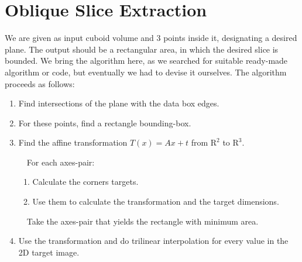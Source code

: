 \section{Oblique Slice Extraction}
\label{sec:oblique}
We are given as input cuboid volume and 3 points inside it, designating a desired plane.
The output should be a rectangular area, in which the desired slice is bounded.
We bring the algorithm here, as we searched for suitable ready-made algorithm or code, but eventually we had to devise it ourselves.
The algorithm proceeds as follows:
\begin{enumerate}
	\item Find intersections of the plane with the data box edges.
	\item For these points, find a rectangle bounding-box.
	\item Find the affine transformation $T(x) = Ax + t $ from $\textrm{R} ^2$ to $\textrm{R}^3$.

	~~For each axes-pair:
	\begin{enumerate}
		\item Calculate the corners targets.
		\item Use them to calculate the transformation and the target dimensions.
	\end{enumerate}
	~~Take the axes-pair that yields the rectangle with minimum area.
	
	\item Use the transformation and do trilinear interpolation for every value in the 2D target image.
\end{enumerate}
